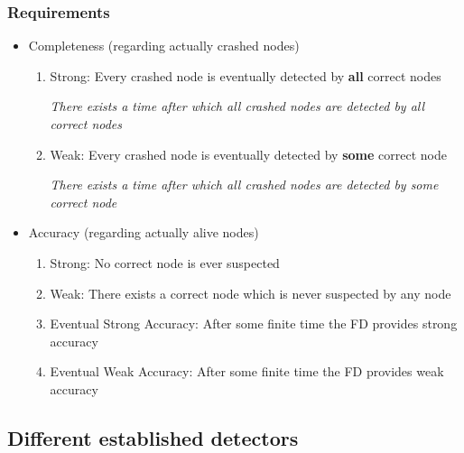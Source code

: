 \subsubsection{Requirements}
\begin{itemize}
    \item Completeness (regarding actually crashed nodes)
    \begin{enumerate}
        \item Strong: Every crashed node is eventually detected by \textbf{all}
            correct nodes

            \textit{There exists a time after which all crashed
            nodes are detected by all correct nodes}

        \item Weak: Every crashed node is eventually detected by \textbf{some}
            correct node

            \textit{There exists a time after which all crashed
            nodes are detected by some correct node}
    \end{enumerate}
    \item Accuracy (regarding actually alive nodes)
        \begin{enumerate}
            \item Strong: No correct node is ever suspected

            \item Weak: There exists a correct node which is never
                suspected by any node

            \item Eventual Strong Accuracy: After some finite time the
                FD provides strong accuracy
            \item Eventual Weak Accuracy: After some finite time the FD
                provides weak accuracy
        \end{enumerate}
\end{itemize}

\subsection{Different established detectors}

